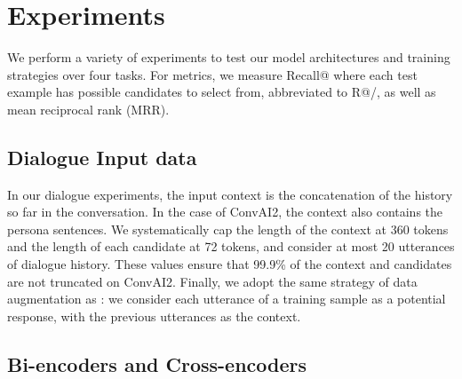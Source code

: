\documentclass{article} \usepackage{iclr2020_conference,times}
\begin{document}
\section{Experiments}
We perform a variety of experiments to test our model architectures and training strategies over four tasks. For metrics, we measure Recall@ where each test example has  possible candidates to select from, 
abbreviated to R@/, as well as mean reciprocal rank (MRR).


\subsection{Dialogue Input data}
In our dialogue experiments, the input context is the concatenation of the history so far in the conversation. In the case of ConvAI2, the context also contains the persona sentences. We systematically cap the length of the context at 360 tokens and the length of each candidate at 72 tokens, and consider at most 20 utterances of dialogue history. These values ensure that 99.9\% of the context and candidates are not truncated on ConvAI2. Finally, we adopt the same strategy of data augmentation as \citep{chen_noetic}: we consider each utterance of a training sample as a potential response, with the previous utterances as the context.
\fi 

\subsection{Bi-encoders and Cross-encoders}
\label{subsection:biencoder}
 
\end{document}
